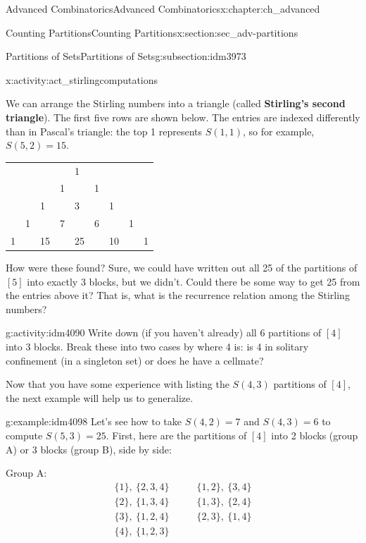 \documentclass[oneside,10pt,]{book}
\newcommand{\terminology}[1]{\textbf{#1}}
\numberwithin{equation}{chapter}
\newcommand{\amp}{&}
\begin{document}
\begin{chapterptx}{Advanced Combinatorics}{}{Advanced Combinatorics}{}{}{x:chapter:ch_advanced}
\begin{sectionptx}{Counting Partitions}{}{Counting Partitions}{}{}{x:section:sec_adv-partitions}
\begin{subsectionptx}{Partitions of Sets}{}{Partitions of Sets}{}{}{g:subsection:idm3973}
\begin{activity}{}{x:activity:act_stirlingcomputations}
\end{activity}
We can arrange the Stirling numbers into a triangle (called \terminology{Stirling's second triangle}).  The first five rows are shown below.  The entries are indexed differently than in Pascal's triangle: the top 1 represents \(S(1,1)\), so for example, \(S(5,2) = 15\).%
\begin{sidebyside}{1}{0.25}{0.25}{0}%
\begin{sbspanel}{0.5}%
{\centering%
\begin{tabular}{lllllllll}
&&&&1&&&&\tabularnewline[0pt]
&&&1&&1&&&\tabularnewline[0pt]
&&1&&3&&1&&\tabularnewline[0pt]
&1&&7&&6&&1&\tabularnewline[0pt]
1&&15&&25&&10&&1
\end{tabular}
\par}
\end{sbspanel}%
\end{sidebyside}%
\par
How were these found?  Sure, we could have written out all 25 of the partitions of \([5]\) into exactly \(3\) blocks, but we didn't.  Could there be some way to get 25 from the entries above it?  That is, what is the recurrence relation among the Stirling numbers?%
\begin{activity}{}{g:activity:idm4090}%
Write down (if you haven't already) all 6 partitions of \([4]\) into \(3\) blocks.  Break these into two cases by where 4 is: is 4 in solitary confinement (in a singleton set) or does he have a cellmate?%
\end{activity}
Now that you have some experience with listing the \(S(4,3)\) partitions of \([4]\), the next example will help us to generalize.%
\begin{example}{}{g:example:idm4098}%
Let's see how to take \(S(4,2) = 7\) and \(S(4,3) = 6\) to compute \(S(5,3) = 25\).  First, here are the partitions of \([4]\) into 2 blocks (group A) or 3 blocks (group B), side by side:%
\begin{sidebyside}{2}{0.05}{0.05}{0.1}%
\begin{sbspanel}{0.5}%
Group A:%
\begin{align*}
\{1\}, ~ \{2,3,4\}\qquad \amp \{1,2\}, ~ \{3, 4\}\\
\{2\}, ~ \{1,3,4\}\qquad \amp \{1,3\}, ~ \{2, 4\}\\
\{3\}, ~ \{1,2,4\} \qquad \amp \{2,3\}, ~ \{1, 4\}\\
\{4\}, ~ \{1,2,3\} \qquad\amp 
\end{align*}
%
\end{sbspanel}%
\begin{sbspanel}{0.3}%

\end{sbspanel}
\end{sidebyside}
\end{example}
\end{subsectionptx}
\end{sectionptx}
\end{chapterptx}
\end{document}
